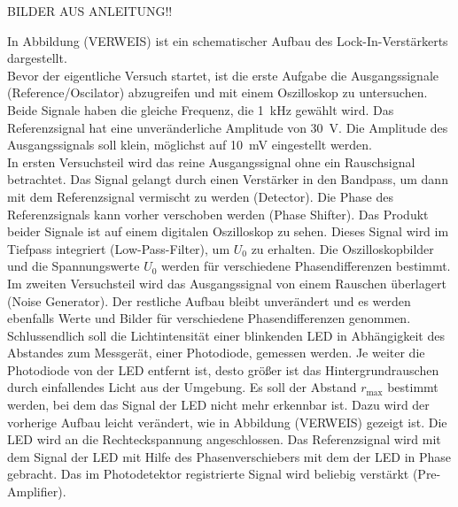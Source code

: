 BILDER AUS ANLEITUNG!!

In Abbildung (VERWEIS) ist ein schematischer Aufbau des Lock-In-Verstärkerts dargestellt.  \\
Bevor der eigentliche Versuch startet, ist die erste Aufgabe die Ausgangssignale (Reference/Oscilator) abzugreifen und mit einem Oszilloskop zu untersuchen. Beide Signale haben die gleiche Frequenz, die  \SI{1}{\kilo\hertz} gewählt wird. Das Referenzsignal hat eine unveränderliche Amplitude von \SI{30}{\volt}. Die Amplitude des Ausgangssignals soll klein, möglichst auf \SI{10}{\milli\volt} eingestellt werden. \\
In ersten Versuchsteil wird das reine Ausgangssignal ohne ein Rauschsignal betrachtet. Das Signal gelangt durch einen Verstärker in den Bandpass, um dann mit dem Referenzsignal vermischt zu werden (Detector). Die Phase des Referenzsignals kann vorher verschoben werden (Phase Shifter). Das Produkt beider Signale ist auf einem digitalen Oszilloskop zu sehen. Dieses Signal wird im Tiefpass integriert (Low-Pass-Filter), um $U_0$ zu erhalten. Die Oszilloskopbilder und die Spannungswerte $U_0$ werden für verschiedene Phasendifferenzen bestimmt. \\
Im zweiten Versuchsteil wird das Ausgangssignal von einem Rauschen überlagert (Noise Generator). Der restliche Aufbau bleibt unverändert und es werden ebenfalls Werte und Bilder für verschiedene Phasendifferenzen genommen. \\
Schlussendlich soll die Lichtintensität einer blinkenden LED in Abhängigkeit des Abstandes zum Messgerät, einer Photodiode, gemessen werden. Je weiter die Photodiode von der LED entfernt ist, desto größer ist das Hintergrundrauschen durch einfallendes Licht aus der Umgebung. Es soll der Abstand $r_\text{max}$ bestimmt werden, bei dem das Signal der LED nicht mehr erkennbar ist. Dazu wird der vorherige Aufbau leicht verändert, wie in Abbildung (VERWEIS) gezeigt ist. Die LED wird an die Rechteckspannung angeschlossen. Das Referenzsignal wird mit dem Signal der LED mit Hilfe des Phasenverschiebers  mit dem der LED in Phase gebracht. Das im Photodetektor registrierte Signal wird beliebig verstärkt (Pre-Amplifier).
